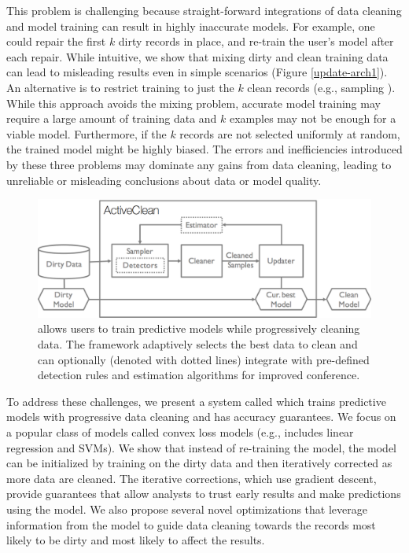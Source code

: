 This problem is challenging because straight-forward integrations of data cleaning and model training can result in highly inaccurate models.
For example, one could repair the first $k$ dirty records in place, and re-train the user's model after each repair.
While intuitive, we show that mixing dirty and clean training data can lead to misleading results even in simple scenarios (Figure \ref{update-arch1}).
An alternative is to restrict training to just the $k$ clean records (e.g., sampling \cite{wang1999sample}).
While this approach avoids the mixing problem, accurate model training may require a large amount of training data and $k$ examples may not be enough for a viable model.
Furthermore, if the $k$ records are not selected uniformly at random, the trained model might be highly biased.
The errors and inefficiencies introduced by these three problems may dominate any gains from data cleaning, leading to unreliable or misleading conclusions about data or model quality.

\begin{figure}[t]
\centering
 \includegraphics[width=\columnwidth]{figs/arch.png}
 \caption{\sysfull allows users to train predictive models while progressively cleaning data. The framework adaptively selects the best data to clean and can optionally (denoted with dotted lines) integrate with pre-defined detection rules and estimation algorithms for improved conference. \label{sys-arch}}\vspace{-2em}
\end{figure}

To address these challenges, we present a system called \sys which trains predictive models with progressive data cleaning and has accuracy guarantees.
We focus on a popular class of models called convex loss models (e.g., includes linear regression and SVMs).
We show that instead of re-training the model, the model can be initialized by training on the dirty data and then iteratively corrected as more data are cleaned.
The iterative corrections, which use gradient descent, provide guarantees that allow analysts to trust early results and make predictions using the model.
We also propose several novel optimizations that leverage information from the model to guide data cleaning towards the records most likely to be dirty and most likely to affect the results.

